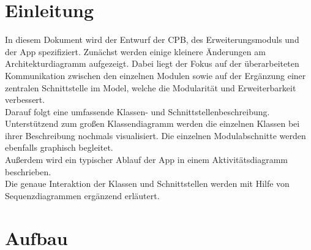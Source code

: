 \documentclass[a4paper,12pt]{article}
\title{\projektName}
\date{\today}
\author{Tec O'Brain}
\begin{document}
 \setcounter{page}{2}
 \tableofcontents          %
 \clearpage

\section{Einleitung}
In diesem Dokument wird der Entwurf der \Gls{CPB}, des Erweiterungsmoduls und der App spezifiziert. Zunächst werden einige kleinere Änderungen am Architekturdiagramm aufgezeigt. Dabei liegt der Fokus auf der überarbeiteten Kommunikation zwischen den einzelnen Modulen sowie auf der Ergänzung einer zentralen Schnittstelle im Model, welche die Modularität und Erweiterbarkeit verbessert. \\
Darauf folgt eine umfassende Klassen- und Schnittstellenbeschreibung. Unterstützend zum großen Klassendiagramm werden die einzelnen Klassen bei ihrer Beschreibung nochmals visualisiert. Die einzelnen Modulabschnitte werden ebenfalls graphisch begleitet. \\
Außerdem wird ein typischer Ablauf der App in einem Aktivitätsdiagramm beschrieben. \\
Die genaue Interaktion der Klassen und Schnittstellen werden mit Hilfe von Sequenzdiagrammen ergänzend erläutert.

\section{Aufbau}
\end{document}
